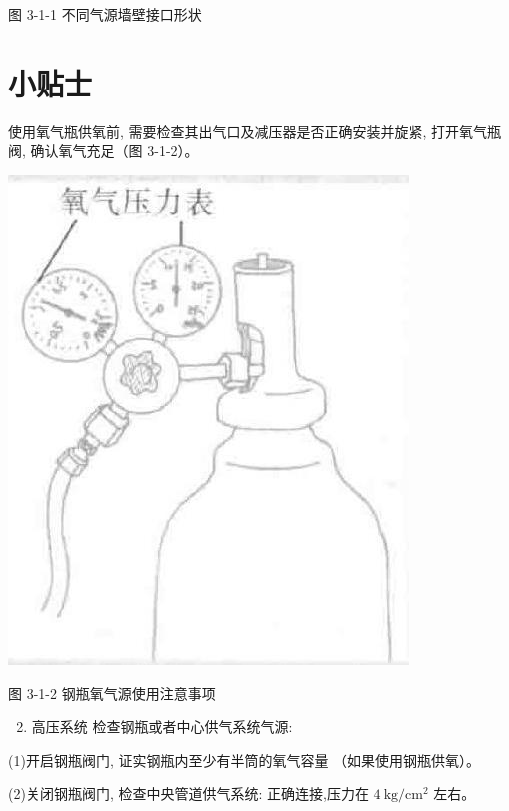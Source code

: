 \documentclass[10pt]{article}
\begin{document}
图 3-1-1 不同气源墙壁接口形状

\section*{小贴士}
使用氧气瓶供氧前, 需要检查其出气口及减压器是否正确安装并旋紧, 打开氧气瓶阀, 确认氧气充足（图 3-1-2）。

\begin{center}
\includegraphics[max width=\textwidth]{2024_07_05_645bb794a4d4f32ee0c8g-068}
\end{center}

图 3-1-2 钢瓶氧气源使用注意事项

\begin{enumerate}
  \setcounter{enumi}{1}
  \item 高压系统 检查钢瓶或者中心供气系统气源:
\end{enumerate}

(1)开启钢瓶阀门, 证实钢瓶内至少有半筒的氧气容量 （如果使用钢瓶供氧）。

(2)关闭钢瓶阀门, 检查中央管道供气系统: 正确连接,压力在 $4 \mathrm{~kg} / \mathrm{cm}^{2}$ 左右。
\end{document}
